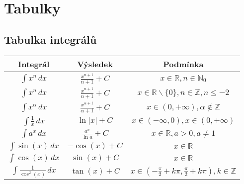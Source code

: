 \section{Tabulky}

\noindent\begin{minipage}{\linewidth}
    \subsection*{Tabulka integrálů}

    \centering
    \begin{tabular}{|c|c|c|}
        \hline
        \textbf{Integrál}                                 & \textbf{Výsledek}                                  & \textbf{Podmínka}                                                                  \\
        \hline
        \(\displaystyle\int x^n \,dx\)                    & \(\displaystyle\frac{x^{n + 1}}{n + 1} + C\)       & \(x\in\mathds{R}, n\in\mathbb{N}_0\)                                               \\
        \(\displaystyle\int x^n \,dx\)                    & \(\displaystyle\frac{x^{n+1}}{n+1} + C\)           & \(x\in\mathds{R}\smallsetminus\{0\}, n\in\mathbb{Z}, n \leq -2\)                   \\
        \(\displaystyle\int x^\alpha \,dx\)               & \(\displaystyle\frac{x^{\alpha+1}}{\alpha+1} + C\) & \(x\in(0,+\infty), \alpha\notin\mathbb{Z}\)                                        \\
        \(\displaystyle\int \frac{1}{x} \,dx\)            & \(\ln |x| + C\)                                    & \(x \in (-\infty, 0), x \in (0, +\infty)\)                                         \\
        \(\displaystyle\int a^x \,dx\)                    & \(\displaystyle\frac{a^x}{\ln a} + C\)             & \(x\in\mathds{R}, a > 0, a\neq 1\)                                                 \\
        \(\displaystyle\int \sin(x) \,dx\)                & \(-\cos(x) + C\)                                   & \(x\in\mathds{R}\)                                                                 \\
        \(\displaystyle\int \cos(x) \,dx\)                & \(\sin(x) + C\)                                    & \(x\in\mathds{R}\)                                                                 \\
        \(\displaystyle\int \frac{1}{\cos^2(x)} \,dx\)    & \(\tan(x) + C\)                                    & \(x\in\left( -\frac{\pi}{2} + k\pi, \frac{\pi}{2} + k\pi \right), k\in\mathbb{Z}\) \\

\end{tabular}
\end{minipage}
